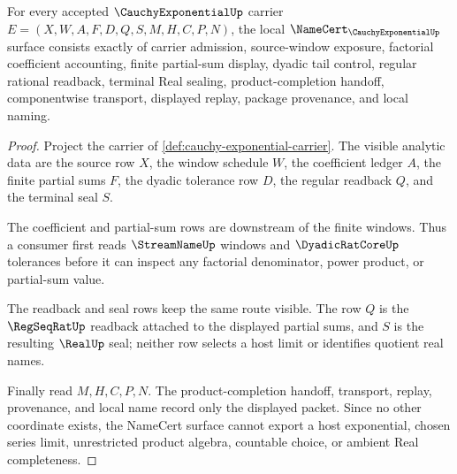 \begin{theorem}
\label{thm:cauchy-exponential-namecert-obligations}
For every accepted $\CauchyExponentialUp$ carrier $E=(X,W,A,F,D,Q,S,M,H,C,P,N)$, the local $\NameCert_{\CauchyExponentialUp}$ surface consists exactly of carrier admission, source-window exposure, factorial coefficient accounting, finite partial-sum display, dyadic tail control, regular rational readback, terminal Real sealing, product-completion handoff, componentwise transport, displayed replay, package provenance, and local naming.
\end{theorem}
\begin{proof}
Project the carrier of \autoref{def:cauchy-exponential-carrier}. The visible analytic data are the source row $X$, the window schedule $W$, the coefficient ledger $A$, the finite partial sums $F$, the dyadic tolerance row $D$, the regular readback $Q$, and the terminal seal $S$.

The coefficient and partial-sum rows are downstream of the finite windows. Thus a consumer first reads $\StreamNameUp$ windows and $\DyadicRatCoreUp$ tolerances before it can inspect any factorial denominator, power product, or partial-sum value.

The readback and seal rows keep the same route visible. The row $Q$ is the $\RegSeqRatUp$ readback attached to the displayed partial sums, and $S$ is the resulting $\RealUp$ seal; neither row selects a host limit or identifies quotient real names.

Finally read $M,H,C,P,N$. The product-completion handoff, transport, replay, provenance, and local name record only the displayed packet. Since no other coordinate exists, the NameCert surface cannot export a host exponential, chosen series limit, unrestricted product algebra, countable choice, or ambient Real completeness.
\end{proof}

